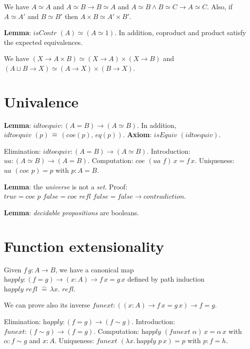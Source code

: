 \documentclass[a4paper]{article}
\begin{document}
We have $A \simeq A$ and $A \simeq B \to B \simeq A$ and $A \simeq B \wedge B \simeq C \to A \simeq C$. Also, if $A \simeq A'$ and $B \simeq B'$ then $A \times B \simeq A' \times B'$.

\textbf{Lemma}: $\textit{isContr }(A) \simeq (A \simeq 1)$. In addition, coproduct and product satisfy the expected equivalences.

We have $(X \to A \times B) \simeq (X \to A) \times (X \to B)$ and $(A \sqcup B  \to X) \simeq (A \to X) \times (B \to X)$.

\section*{Univalence}

\textbf{Lemma}: $\textit{idtoequiv} : (A = B) \to (A \simeq B)$. In addition, $\textit{idtoequiv }(p) \, \hat{=} \, (\textit{coe}(p), \, \textit{eq}(p))$. \textbf{Axiom}: $\textit{isEquiv }(\textit{idtoequiv})$.

Elimination: $\textit{idtoequiv} : (A = B) \to (A \simeq B)$. Introduction: $\textit{ua} : (A \simeq B) \to (A = B)$. Computation: $\textit{coe }(\textit{ua } f) \, x = f \, x$. Uniqueness: $\textit{ua }(\textit{coe } p) = p$ with $p : A = B$.

\textbf{Lemma}: the \textit{universe} is not a \textit{set}. Proof: $\textit{true} = \textit{coe } p \textit{ false} = \textit{coe } \textit{refl } \textit{false} = \textit{false} \to \textit{contradiction}$.

\textbf{Lemma}: \textit{decidable} \textit{propositions} are booleans.

\section*{Function extensionality}

Given $f \, g : A \to B$, we have a canonical map $\textit{happly} : (f = g) \to (x : A) \to f \, x = g \, x$ defined by path induction $\textit{happly } \textit{refl } \hat{=} \, \lambda x. \textit{ refl}$.

We can prove also its inverse $\textit{funext} : ((x : A) \to f \, x = g \, x) \to f = g$.

Elimination: $\textit{happly} : (f = g) \to (f \sim g)$. Introduction: $\textit{funext} : (f \sim g) \to (f = g)$. Computation: $\textit{happly } (\textit{funext } \alpha) \, x = \alpha \, x$ with $\alpha : f \sim g$ and $x : A$. Uniqueness: $\textit{funext } (\lambda x. \, \textit{happly } p \, x) = p$ with $p : f = h$.
\end{document}
